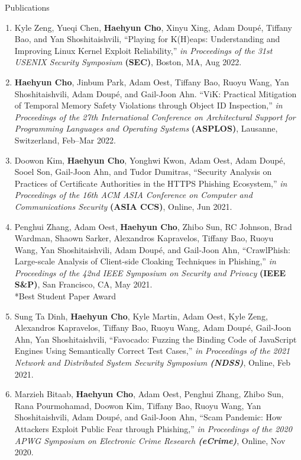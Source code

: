 \documentclass{resume} %
\begin{document}
\begin{rSection}{\faGenderless~Publications}
\begin{enumerate}[leftmargin=0pt]
		\item Kyle Zeng, Yueqi Chen, \textbf{Haehyun Cho}, Xinyu Xing, Adam Doup\'e, Tiffany Bao, and Yan Shoshitaishvili,
		``Playing for K(H)eaps: Understanding and Improving Linux Kernel Exploit Reliability,'' 
		\emph{in Proceedings of the 31st USENIX Security Symposium} \textbf{(SEC)},
		Boston, MA, Aug 2022.

		\item \textbf{Haehyun Cho}, Jinbum Park, Adam Oest, Tiffany Bao, Ruoyu Wang, Yan Shoshitaishvili, Adam Doup\'e, and Gail-Joon Ahn.
		``ViK: Practical Mitigation of Temporal Memory Safety Violations through Object ID Inspection,'' 
		\emph{in Proceedings of the 27th International Conference on Architectural Support for Programming Languages and Operating Systems} \textbf{(ASPLOS)},
		Lausanne, Switzerland, Feb--Mar 2022.

    	\item Doowon Kim, \textbf{Haehyun Cho}, Yonghwi Kwon, Adam Oest, Adam Doup\'e, Sooel Son, Gail-Joon Ahn, and Tudor Dumitras,
    	``Security Analysis on Practices of Certificate Authorities in the HTTPS Phishing Ecosystem,''
    	\emph{in Proceedings of the 16th ACM ASIA Conference on Computer and Communications Security} \textbf{(ASIA CCS)},
    	Online, Jun 2021.

    	\item Penghui Zhang, Adam Oest, \textbf{Haehyun Cho}, Zhibo Sun, RC Johnson, Brad Wardman, Shaown Sarker, Alexandros Kapravelos, Tiffany Bao, Ruoyu Wang, Yan Shoshitaishvili, Adam Doup\'e, and Gail-Joon Ahn,
    	``CrawlPhish: Large-scale Analysis of Client-side Cloaking Techniques in Phishing,''
        \emph{in Proceedings of the 42nd IEEE Symposium on Security and Privacy} \textbf{(IEEE S\&P)},
    	San Francisco, CA, May 2021.\\
        {*}Best Student Paper Award

    	\item Sung Ta Dinh, \textbf{Haehyun Cho}, Kyle Martin, Adam Oest, Kyle Zeng, Alexandros Kapravelos, Tiffany Bao, Ruoyu Wang, Adam Doup\'e, Gail-Joon Ahn, Yan Shoshitaishvili,
        ``Favocado: Fuzzing the Binding Code of JavaScript Engines Using Semantically Correct Test Cases,''
        \emph{in Proceedings of the 2021 Network and Distributed System Security Symposium \textbf{(NDSS)}},
        Online, Feb 2021.

        \item Marzieh Bitaab, \textbf{Haehyun Cho}, Adam Oest, Penghui Zhang, Zhibo Sun, Rana Pourmohamad, Doowon Kim, Tiffany Bao, Ruoyu Wang, Yan Shoshitaishvili, Adam Doup\'e, and Gail-Joon Ahn,
        ``Scam Pandemic: How Attackers Exploit Public Fear through Phishing,''
        \emph{in Proceedings of the 2020 APWG Symposium on Electronic Crime Research \textbf{(eCrime)}},
        Online, Nov 2020.


\end{enumerate}
\end{rSection}
\end{document}

